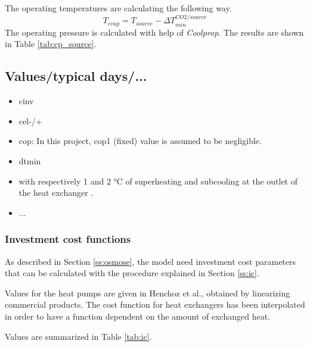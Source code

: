 \documentclass{article}
\begin{document}
The operating temperatures are calculating the following way.
\begin{equation}
    T_{evap} = T_{source} - \Delta T_{min}^{CO2/source}
\end{equation}
The operating pressure is calculated with help of \textit{Coolprop}. The results are shown in Table \ref{tab:cp_source}.



\subsection{Values/typical days/...}
\begin{itemize}
	\item cinv
	\item cel-/+
	\item cop: In this project, cop1 (fixed) value is assumed to be negligible.
	\item dtmin
	\item with respectively 1 and 2 \si{\celsius} of superheating and subcooling at the outlet of the heat exchanger \cite{}.
	\item ...
\end{itemize}

\subsubsection{Investment cost functions}

As described in Section \ref{ss:osmose}, the model need investment cost parameters that can be calculated with the procedure explained in Section \ref{ss:ic}.

Values for the heat pumps are given in Henchoz et al., obtained by linearizing commercial products\cite{henchozPerformanceProfitabilityPerspectives2015}. The cost function for heat exchangers has been interpolated in order to have a function dependent on the amount of exchanged heat.



Values are summarized in Table \ref{tab:ic}.
\end{document}
